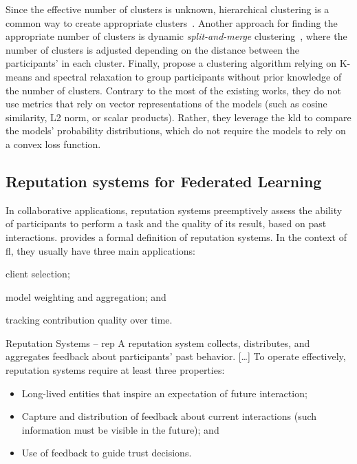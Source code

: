Since the effective number of clusters is unknown, hierarchical clustering is a common way to create appropriate clusters~\cite{briggs_Federatedlearninghierarchical_2020,ye_PFedSAPersonalizedFederated_2023}. 
Another approach for finding the appropriate number of clusters is dynamic \emph{split-and-merge} clustering~\cite{chen_ZeroKnowledgeClustering_2021}, where the number of clusters is adjusted depending on the distance between the participants' in each cluster.
Finally, \textcite{ouyang_ClusterFLClusteringbasedFederated_2022} propose a clustering algorithm relying on K-means and spectral relaxation to group participants without prior knowledge of the number of clusters.
Contrary to the most of the existing works, they do not use metrics that rely on vector representations of the models (such as cosine similarity, L2 norm, or scalar products).
Rather, they leverage the \gls{kld} to compare the models' probability distributions, which do not require the models to rely on a convex loss function.


\subsection{Reputation systems for Federated Learning\label{sec:radar.prelim.reputation}}

In collaborative applications, reputation systems preemptively assess the ability of participants to perform a task and the quality of its result, based on past interactions.
 provides a formal definition of reputation systems.
In the context of \gls{fl}, they usually have three main applications:
  \begin{enumerate*}[(i)]
      \item client selection;
      \item model weighting and aggregation; and
      \item tracking contribution quality over time.
  \end{enumerate*}


\begin{definitionbox}{Reputation Systems -- \normalfont\textcite{resnick_Reputationsystems_2000}}{rep}
  A reputation system collects, distributes, and aggregates feedback about participants’ past behavior.
  [\dots]
  To operate effectively, reputation systems require at least three properties: 
  \begin{itemize}[\textbullet]
    \item Long-lived entities that inspire an expectation of future interaction;
    \item Capture and distribution of feedback about current interactions (such information must be visible in the future); and
    \item Use of feedback to guide trust decisions.
  \end{itemize}
\end{definitionbox}

